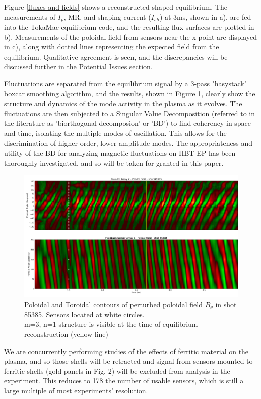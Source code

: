 \documentclass[aps,prl,twocolumn,superscriptaddress,groupedaddress]{revtex4}  %
\begin{document}
	Figure \ref{fluxes and fields} shows a reconstructed shaped equilibrium.  The measurements of $I_p$, MR, and shaping current ($I_{sh}$) at 3ms, shown in a), are fed into the TokaMac equilibrium code, and the resulting flux surfaces are plotted in b).  Measurements of the poloidal field from sensors near the x-point are displayed in c), along with dotted lines representing the expected field from the equilibrium.  Qualitative agreement is seen, and the discrepancies will be discussed further in the Potential Issues section.\par
	Fluctuations are separated from the equilibrium signal by a 3-pass "hasystack" boxcar smoothing algorithm, and the results, shown in Figure \ref{Stripey_85385}, clearly show the structure and dynamics of the mode activity in the plasma as it evolves.  The fluctuations are then subjected to a Singular Value Decomposition (referred to in the literature as 'biorthogonal decomposion' or 'BD'\cite{de Wit}) to find coherency in space and time, isolating the multiple modes of oscillation.  This allows for the discrimination of higher order, lower amplitude modes.  The appropriateness and utility of the BD for analyzing magnetic fluctuations on HBT-EP has been thoroughly investigated\cite{Levesque}, and so will be taken for granted in this paper.\par
\begin{figure}[htb]
\centering
\includegraphics[scale=.2]{../Plots/stripey_plot_85385.png}\caption{Poloidal and Toroidal contours of perturbed poloidal field $B_\theta$ in shot 85385.  Sensors located at white circles.\\m=3, n=1 structure is visible at the time of equilibrium reconstruction (yellow line)}
	\label{Stripey_85385}
	\end{figure}
	We are concurrently performing studies of the effects of ferritic material on the plasma, and so those shells will be retracted and signal from sensors mounted to ferritic shells (gold panels in Fig. 2)  will be excluded from analysis in the experiment.  This reduces to 178 the number of usable sensors, which is still a large multiple of most experiments' resolution.
	
\end{document}
